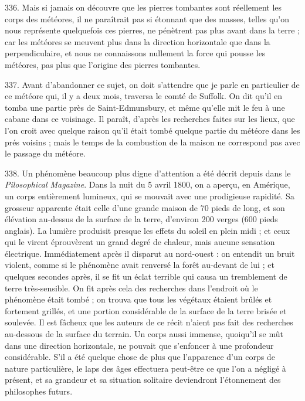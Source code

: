 \documentclass[a4paper, 11pt, oneside, polutonikogreek, french]{article}
\begin{document}
336. Mais si jamais on découvre que les pierres tombantes sont réellement les corps des météores, il ne paraîtrait pas si étonnant que des masses, telles qu'on nous représente quelquefois ces pierres, ne pénètrent pas plus avant dans la terre ; car les météores se meuvent plus dans la direction horizontale que dans la perpendiculaire, et nous ne connaissons nullement la force qui pousse les météores, pas plus que l'origine des pierres tombantes.

337. Avant d'abandonner ce sujet, on doit s'attendre que je parle en particulier de ce météore qui, il y a deux mois, traversa le comté de Suffolk. On dit qu'il en tomba une partie près de Saint-Edmunsbury, et même qu'elle mit le feu à une cabane dans ce voisinage. Il paraît, d'après les recherches faites sur les lieux, que l'on croit avec quelque raison qu'il était tombé quelque partie du météore dans les prés voisins ; mais le temps de la combustion de la maison ne correspond pas avec le passage du météore.

338. Un phénomène beaucoup plus digne d'attention a été décrit depuis dans le \emph{Pilosophical Magazine}. Dans la nuit du 5 avril 1800, on a aperçu, en Amérique, un corps entièrement lumineux, qui se mouvait avec une prodigieuse rapidité. Sa grosseur apparente était celle d'une grande maison de 70 pieds de long, et son élévation au-dessus de la surface de la terre, d'environ 200 verges (600 pieds anglais). La lumière produisit presque les effets du soleil en plein midi ; et ceux qui le virent éprouvèrent un grand degré de chaleur, mais aucune sensation électrique. Immédiatement après il disparut au nord-ouest : on entendit un bruit violent, comme si le phénomène avait renversé la forêt au-devant de lui ; et quelques secondes après, il se fit un éclat terrible qui causa un tremblement de terre très-sensible. On fit après cela des recherches dans l'endroit où le phénomène était tombé ; on trouva que tous les végétaux étaient brûlés et fortement grillés, et une portion considérable de la surface de la terre brisée et soulevée. Il est fâcheux que les auteurs de ce récit n'aient pas fait des recherches au-dessous de la surface du terrain. Un corps aussi immense, quoiqu'il se mût dans une direction horizontale, ne pouvait que s'enfoncer à une profondeur considérable. S'il a été quelque chose de plus que l'apparence d'un corps de nature particulière, le laps des âges effectuera peut-être ce que l'on a négligé à présent, et sa grandeur et sa situation solitaire deviendront l'étonnement des philosophes futurs.
\end{document}
